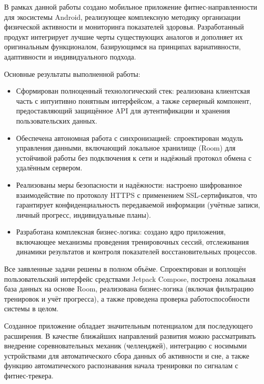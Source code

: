 
В рамках данной работы создано мобильное приложение фитнес-направленности для экосистемы Android, реализующее комплексную методику организации физической активности и мониторинга показателей здоровья. Разработанный продукт интегрирует лучшие черты существующих аналогов и дополняет их оригинальным функционалом, базирующимся на принципах вариативности, адаптивности и индивидуального подхода.

Основные результаты выполненной работы:

\begin{itemize}
    \item Сформирован полноценный технологический стек: реализована клиентская часть с интуитивно понятным интерфейсом, а также серверный компонент, предоставляющий защищённое API для аутентификации и хранения пользовательских данных.

    \item Обеспечена автономная работа с синхронизацией: спроектирован модуль управления данными, включающий локальное хранилище (Room) для устойчивой работы без подключения к сети и надёжный протокол обмена с удалённым сервером.

    \item Реализованы меры безопасности и надёжности: настроено шифрованное взаимодействие по протоколу HTTPS с применением SSL-сертификатов, что гарантирует конфиденциальность передаваемой информации (учётные записи, личный прогресс, индивидуальные планы).

    \item Разработана комплексная бизнес-логика: создано ядро приложения, включающее механизмы проведения тренировочных сессий, отслеживания динамики результатов и контроля показателей восстановительных процессов.
\end{itemize}

Все заявленные задачи решены в полном объёме. Спроектирован и воплощён пользовательский интерфейс средствами Jetpack Compose, построена локальная база данных на основе Room, реализована бизнес-логика (включая фильтрацию тренировок и учёт прогресса), а также проведена проверка работоспособности системы в целом.

Созданное приложение обладает значительным потенциалом для последующего расширения. В качестве ближайших направлений развития можно рассматривать внедрение соревновательных механик (челленджей), интеграцию с носимыми устройствами для автоматического сбора данных об активности и сне, а также функцию автоматического распознавания начала тренировки по сигналам с фитнес-трекера.

